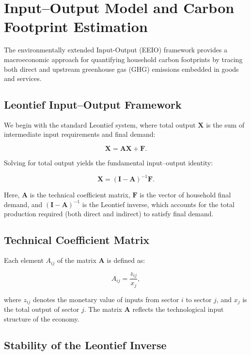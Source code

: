 \documentclass[12pt,a4paper]{article}%
\begin{document}
\section{Input–Output Model and Carbon Footprint Estimation}
The environmentally extended Input-Output (EEIO) framework provides a macroeconomic approach for quantifying household carbon footprints by tracing both direct and upstream greenhouse gas (GHG) emissions embedded in goods and services. 

\subsection{Leontief Input–Output Framework}

We begin with the standard Leontief system, where total output \( \mathbf{X} \) is the sum of intermediate input requirements and final demand:

\begin{equation}
\mathbf{X} = \mathbf{A} \mathbf{X} + \mathbf{F}.
\end{equation}

Solving for total output yields the fundamental input–output identity:

\begin{equation}
\mathbf{X} = {(\mathbf{I} - \mathbf{A})}^{-1} \mathbf{F}.
\end{equation}

Here, \( \mathbf{A} \) is the technical coefficient matrix, \( \mathbf{F} \) is the vector of household final demand, and \( {(\mathbf{I} - \mathbf{A})}^{-1} \) is the Leontief inverse, which accounts for the total production required (both direct and indirect) to satisfy final demand.

\subsection{Technical Coefficient Matrix}

Each element \( A_{ij} \) of the matrix \( \mathbf{A} \) is defined as:

\begin{equation}
A_{ij} = \frac{z_{ij}}{x_j},
\end{equation}

where \( z_{ij} \) denotes the monetary value of inputs from sector \( i \) to sector \( j \), and \( x_j \) is the total output of sector \( j \). The matrix \( \mathbf{A} \) reflects the technological input structure of the economy.

\subsection{Stability of the Leontief Inverse}
\end{document}
